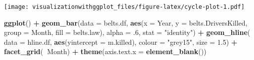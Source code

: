\documentclass[]{krantz}
\makeatletter
\newenvironment{Shaded}{\begin{snugshade}}{\end{snugshade}}
\newcommand{\DataTypeTok}[1]{\textcolor[rgb]{0.13,0.29,0.53}{#1}}
\newcommand{\FloatTok}[1]{\textcolor[rgb]{0.00,0.00,0.81}{#1}}
\newcommand{\KeywordTok}[1]{\textcolor[rgb]{0.13,0.29,0.53}{\textbf{#1}}}
\newcommand{\NormalTok}[1]{#1}
\newcommand{\OperatorTok}[1]{\textcolor[rgb]{0.81,0.36,0.00}{\textbf{#1}}}
\newcommand{\StringTok}[1]{\textcolor[rgb]{0.31,0.60,0.02}{#1}}
\newenvironment{kframe}{%
\medskip{}
\setlength{\fboxsep}{.8em}
 \def\at@end@of@kframe{}%
 \ifinner\ifhmode%
  \def\at@end@of@kframe{\end{minipage}}%
  \begin{minipage}{\columnwidth}%
 \fi\fi%
 \def\FrameCommand##1{\hskip\@totalleftmargin \hskip-\fboxsep
 \colorbox{shadecolor}{##1}\hskip-\fboxsep
     \hskip-\linewidth \hskip-\@totalleftmargin \hskip\columnwidth}%
 \MakeFramed {\advance\hsize-\width
   \@totalleftmargin\z@ \linewidth\hsize
   \@setminipage}}%
 {\par\unskip\endMakeFramed%
 \at@end@of@kframe}
\renewenvironment{Shaded}{\begin{kframe}}{\end{kframe}}
\makeatother
\begin{document}
\begin{Shaded}
\end{Shaded}

\texttt{[image: visualizationwithggplot\_files/figure-latex/cycle-plot-1.pdf]}

\begin{Shaded}
\begin{Highlighting}[]
\KeywordTok{ggplot}\NormalTok{() }\OperatorTok{+}
\StringTok{  }\KeywordTok{geom_bar}\NormalTok{(}\DataTypeTok{data =}\NormalTok{ belts.df, }\KeywordTok{aes}\NormalTok{(}\DataTypeTok{x =}\NormalTok{ Year, }\DataTypeTok{y =}\NormalTok{ belts.DriversKilled, }\DataTypeTok{group =}\NormalTok{ Month, }\DataTypeTok{fill =}\NormalTok{ belts.law), }\DataTypeTok{alpha =} \FloatTok{.6}\NormalTok{, }
    \DataTypeTok{stat =} \StringTok{"identity"}\NormalTok{) }\OperatorTok{+}
\StringTok{  }\KeywordTok{geom_hline}\NormalTok{( }\DataTypeTok{data =}\NormalTok{ hline.df, }\KeywordTok{aes}\NormalTok{(}\DataTypeTok{yintercept =}\NormalTok{ m.killed), }\DataTypeTok{colour =} \StringTok{"grey15"}\NormalTok{, }\DataTypeTok{size =} \FloatTok{1.5}\NormalTok{) }\OperatorTok{+}
\StringTok{  }\KeywordTok{facet_grid}\NormalTok{(}\OperatorTok{~}\NormalTok{Month) }\OperatorTok{+}
\StringTok{  }\KeywordTok{theme}\NormalTok{(}\DataTypeTok{axis.text.x =} \KeywordTok{element_blank}\NormalTok{())}
\end{Highlighting}
\end{Shaded}
\end{document}

